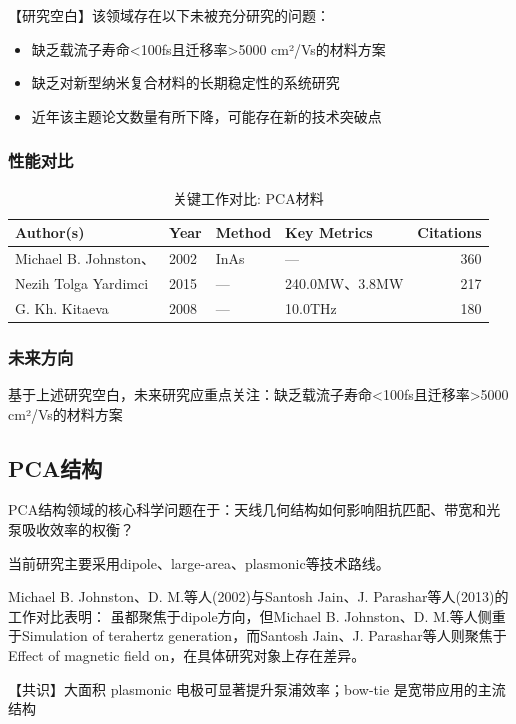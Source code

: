 \documentclass[reprint,amsmath,amssymb,aps,floatfix]{revtex4-2}
\begin{document}
\par\par{【研究空白】该领域存在以下未被充分研究的问题：}
\begin{itemize}
\item 缺乏载流子寿命<100fs且迁移率>5000 cm²/Vs的材料方案
\item 缺乏对新型纳米复合材料的长期稳定性的系统研究
\item 近年该主题论文数量有所下降，可能存在新的技术突破点
\end{itemize}

\subsubsection*{性能对比}
\begin{table}[h!]
\caption{关键工作对比: PCA材料}
\begin{tabular}{@{}llp{2.5cm}p{2.5cm}r@{}}
\hline
Author(s) & Year & Method & Key Metrics & Citations\\
\hline
Michael B. Johnston、 & 2002 & InAs & --- & 360\\
Nezih Tolga Yardimci & 2015 & --- & 240.0MW、3.8MW & 217\\
G. Kh. Kitaeva & 2008 & --- & 10.0THz & 180\\
\hline
\end{tabular}
\end{table}

\subsubsection*{未来方向}
基于上述研究空白，未来研究应重点关注：缺乏载流子寿命<100fs且迁移率>5000 cm²/Vs的材料方案

\subsection{PCA结构}
\par\par{PCA结构领域的核心科学问题在于：天线几何结构如何影响阻抗匹配、带宽和光泵吸收效率的权衡？}

\par\par{当前研究主要采用dipole、large-area、plasmonic等技术路线。}
\par\par{Michael B. Johnston、D. M.等人(2002)与Santosh Jain、J. Parashar等人(2013)的工作对比表明：}
虽都聚焦于dipole方向，但Michael B. Johnston、D. M.等人侧重于Simulation of terahertz generation，而Santosh Jain、J. Parashar等人则聚焦于Effect of magnetic field on，在具体研究对象上存在差异。
\par\par{【共识】大面积 plasmonic 电极可显著提升泵浦效率；bow-tie 是宽带应用的主流结构}
\end{document}

